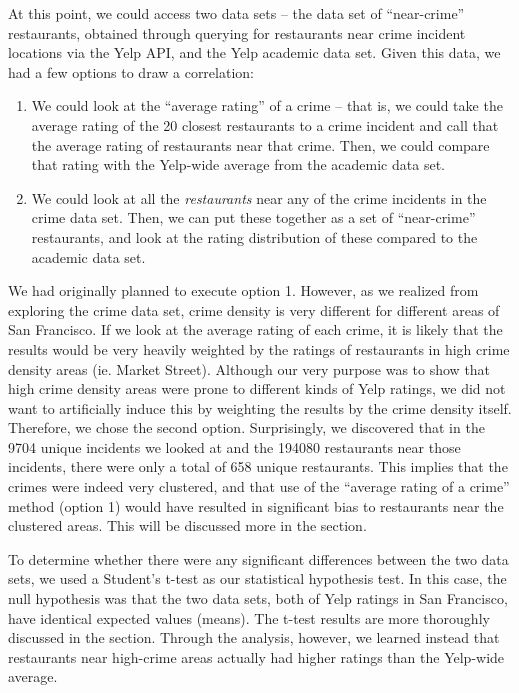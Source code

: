 \documentclass{article}
\begin{document}
At this point, we could access two data sets -- the data set of
``near-crime'' restaurants, obtained through querying for restaurants near
crime incident locations via the Yelp API, and the Yelp academic data
set. Given this data, we had a few options to draw a correlation:
\begin{enumerate}
\item We could look at the ``average rating'' of a crime -- that is, we
  could take the average rating of the 20 closest restaurants to a crime
  incident and call that the average rating of restaurants near that
  crime. Then, we could compare that rating with the Yelp-wide average from
  the academic data set.
\item We could look at all the \textit{restaurants} near any of the crime
  incidents in the crime data set. Then, we can put these together as a set
  of ``near-crime'' restaurants, and look at the rating distribution of
  these compared to the academic data set.
\end{enumerate}
We had originally planned to execute option 1. However, as we realized from
exploring the crime data set, crime density is very different for different
areas of San Francisco. If we look at the average rating of each crime, it
is likely that the results would be very heavily weighted by the ratings of
restaurants in high crime density areas (ie. Market Street). Although our
very purpose was to show that high crime density areas were prone to
different kinds of Yelp ratings, we did not want to artificially induce
this by weighting the results by the crime density itself. Therefore, we
chose the second option. Surprisingly, we discovered that in the 9704
unique incidents we looked at and the 194080 restaurants near those
incidents, there were only a total of 658 unique restaurants. This implies
that the crimes were indeed very clustered, and that use of the ``average
rating of a crime'' method (option 1) would have resulted in significant
bias to restaurants near the clustered areas. This will be discussed more
in the \textbf{} section.

To determine whether there were any significant differences between the two
data sets, we used a Student's t-test as our statistical hypothesis
test. In this case, the null hypothesis was that the two data sets, both of
Yelp ratings in San Francisco, have identical expected values (means). The
t-test results are more thoroughly discussed in the
\textbf{} section. Through the analysis, however, we
learned instead that restaurants near high-crime areas actually had higher
ratings than the Yelp-wide average.
\end{document}
